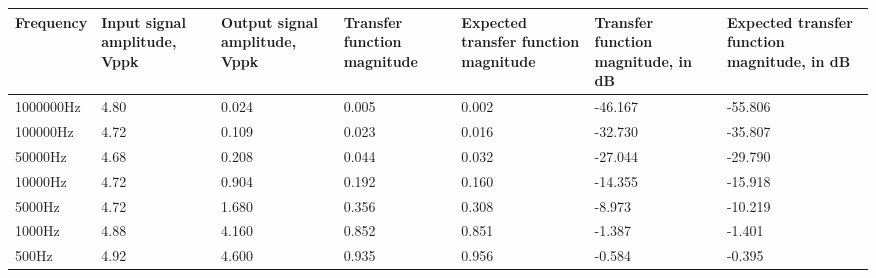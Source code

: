 \begin{table}[!h]
\begin{center}
\begin{tabular}{|p{2cm}|p{2cm}|p{2cm}|p{2cm}|p{2cm}|p{2cm}|p{2cm}|}
\hline
Frequency & Input signal amplitude, Vppk & Output signal amplitude, Vppk & Transfer function magnitude & Expected transfer function magnitude & Transfer function magnitude, in dB & Expected transfer function magnitude, in dB \\
\hline
1000000Hz	&	4.80	&	0.024	&	0.005	&	0.002	&	-46.167	&	-55.806	\\
\hline
100000Hz	&	4.72	&	0.109	&	0.023	&	0.016	&	-32.730	&	-35.807	\\
\hline
50000Hz	&	4.68	&	0.208	&	0.044	&	0.032	&	-27.044	&	-29.790	\\
\hline
10000Hz	&	4.72	&	0.904	&	0.192	&	0.160	&	-14.355	&	-15.918	\\
\hline
5000Hz	&	4.72	&	1.680	&	0.356	&	0.308	&	-8.973	&	-10.219	\\
\hline
1000Hz	&	4.88	&	4.160	&	0.852	&	0.851	&	-1.387	&	-1.401	\\
\hline
500Hz	&	4.92	&	4.600	&	0.935	&	0.956	&	-0.584	&	-0.395	\\
\hline
\end{tabular}
\label{tab-low}
\end{center}
\end{table}
